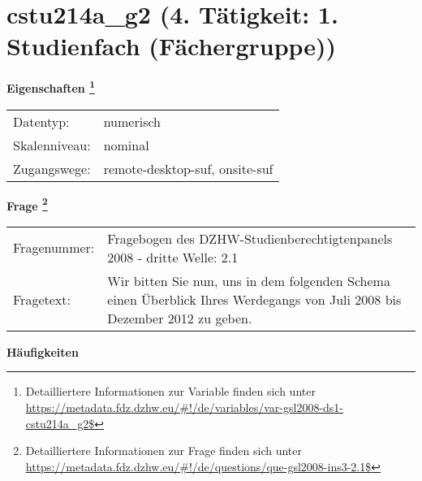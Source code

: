 
    \setcounter{footnote}{0}

    \vspace*{-1.8cm}
	\section{cstu214a\_g2 (4. Tätigkeit: 1. Studienfach (Fächergruppe))}
	\label{section:cstu214a_g2}



    \vspace*{0.5cm}
    \noindent\textbf{Eigenschaften
	\footnote{Detailliertere Informationen zur Variable finden sich unter
		\url{https://metadata.fdz.dzhw.eu/\#!/de/variables/var-gsl2008-ds1-cstu214a_g2$}}}\\
	\begin{tabularx}{\hsize}{@{}lX}
	Datentyp: & numerisch \\
	Skalenniveau: & nominal \\
	Zugangswege: &
	  remote-desktop-suf, 
	  onsite-suf
 \\
    \end{tabularx}



				\vspace*{0.5cm}
                \noindent\textbf{Frage
	                \footnote{Detailliertere Informationen zur Frage finden sich unter
		              \url{https://metadata.fdz.dzhw.eu/\#!/de/questions/que-gsl2008-ins3-2.1$}}}\\
				\begin{tabularx}{\hsize}{@{}lX}
					Fragenummer: &
					  Fragebogen des DZHW-Studienberechtigtenpanels 2008 - dritte Welle:
					  2.1
 \\
					Fragetext: & Wir bitten Sie nun, uns in dem folgenden Schema einen Überblick Ihres Werdegangs von Juli 2008 bis Dezember 2012 zu geben. \\
				\end{tabularx}





        		\vspace*{0.5cm}
                \noindent\textbf{Häufigkeiten}

